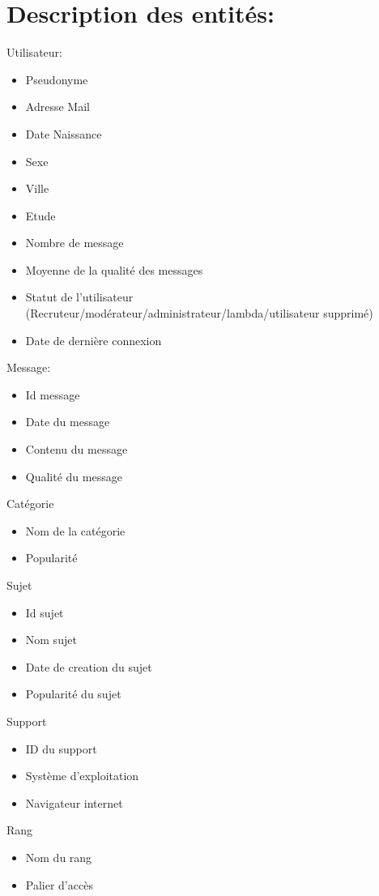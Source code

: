 \documentclass{report}
\begin{document}
\section{Description des entités:}
Utilisateur:
\begin{itemize}
		\item Pseudonyme
		\item Adresse Mail
		\item Date Naissance
		\item Sexe
		\item Ville
		\item Etude
		\item Nombre de message
		\item Moyenne de la qualité des messages
		\item Statut de l'utilisateur (Recruteur/modérateur/administrateur/lambda/utilisateur supprimé)
		\item Date de dernière connexion\\
\end{itemize}
Message:
\begin{itemize}
	\item Id message
	\item Date du message
	\item Contenu du message
	\item Qualité du message\\
\end{itemize}
\pagebreak
Catégorie
\begin{itemize}
	\item Nom de la catégorie
	\item Popularité\\
\end{itemize}
Sujet
\begin{itemize}
	\item Id sujet
   \item Nom sujet
	\item Date de creation du sujet
	\item Popularité du sujet\\
\end{itemize}
	Support
  \begin{itemize}
		\item ID du support
		\item Système d’exploitation
		\item Navigateur internet\\
  \end{itemize}
	Rang
  \begin{itemize}
		\item Nom du rang
		\item Palier d'accès\\
    \end{itemize}
\end{document}
